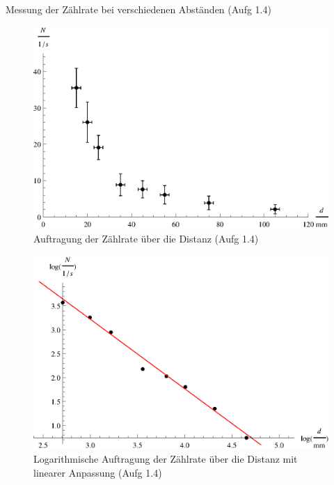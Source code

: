 \begin{table}[tb]
	\centering
	\caption{Messung der Zählrate bei verschiedenen Abständen (Aufg 1.4)}
	\label{tab:iii_1p4}
	
\end{table}

\begin{figure}[tb]
	\centering
	\includegraphics[scale=0.9]{fig/iii_1p4_error.eps}
	\caption{Auftragung der Zählrate über die Distanz (Aufg 1.4)}
	\label{fig:iii_1p4_error}
\end{figure}

\begin{figure}[tb]
	\centering
	\includegraphics[scale=1.0]{fig/iii_1p4_log.eps}
	\caption{Logarithmische Auftragung der Zählrate über die Distanz mit linearer Anpassung (Aufg 1.4)}
	\label{fig:iii_1p4_log}
\end{figure}

